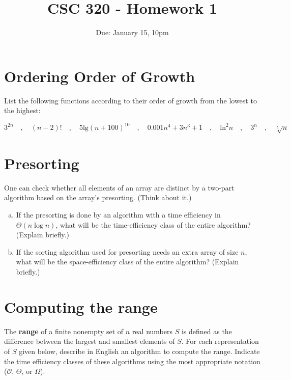 \documentclass[12pt]{article}
\title{CSC 320 - Homework 1}
\author{}
\date{Due: January 15, 10pm}
\begin{document}
{\small \tableofcontents}




\section{Ordering Order of Growth}

List the following functions according to their order of growth from the lowest to the highest:

\[
    3^{2n} \quad,\quad  (n-2)!  \quad,\quad  5 \textrm{lg}(n+100)^{10}
    \quad,\quad  0.001n^4 + 3n^3 + 1    \quad,\quad      \textrm{ln}^2 n
    \quad,\quad     3^n    \quad,\quad    \sqrt[5]{n}
\]

\vspace{1in}


\section{Presorting}

One can check whether all elements of an array are distinct by a two-part algorithm based on the array's presorting. (Think about it.)

\begin{enumerate}[a.]
    \item If the presorting is done by an algorithm with a time efficiency in
    $\Theta(n \log n)$, what will be the time-efficiency class of the entire algorithm? (Explain briefly.)
    \vspace{1.1in}

    \item If the sorting algorithm used for presorting needs an extra array of size $n$, what will be the space-efficiency class of the entire algorithm? (Explain briefly.)
\end{enumerate}




\clearpage
\section{Computing the range}

The \textbf{range} of a finite nonempty set of $n$ real numbers $S$ is defined as the difference between the largest and smallest elements of $S$. For each representation of $S$ given below, describe in English an algorithm to compute the range. Indicate the time efficiency classes of these algorithms using the most appropriate notation ($\mathcal{O}$, $\Theta$, or $\Omega$).
\end{document}
